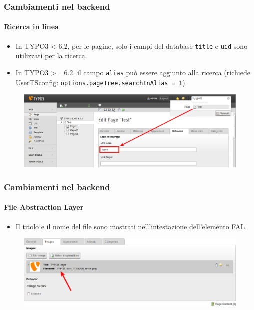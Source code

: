 
\begin{frame}[fragile]
	\frametitle{Cambiamenti nel backend}
	\framesubtitle{Ricerca in linea}

	\begin{itemize}
		\item In TYPO3 < 6.2, per le pagine, solo i campi del database \texttt{title} e \texttt{uid} sono utilizzati per la ricerca
		\item In TYPO3 >= 6.2, il campo \texttt{alias} può essere aggiunto alla ricerca\newline
			(richiede UserTSconfig: \texttt{options.pageTree.searchInAlias = 1})
	\end{itemize}

	\begin{figure}
		\includegraphics[width=0.95\linewidth]{Images/BackendChanges/LiveSearchInAlias.png}
	\end{figure}

\end{frame}


\begin{frame}[fragile]
	\frametitle{Cambiamenti nel backend}
	\framesubtitle{File Abstraction Layer}

	\begin{itemize}
		\item Il titolo e il nome del file sono mostrati nell'intestazione dell'elemento FAL
	\end{itemize}

	\begin{figure}
		\includegraphics[width=0.95\linewidth]{Images/BackendChanges/FalTitleAndFilename.png}
	\end{figure}

\end{frame}


